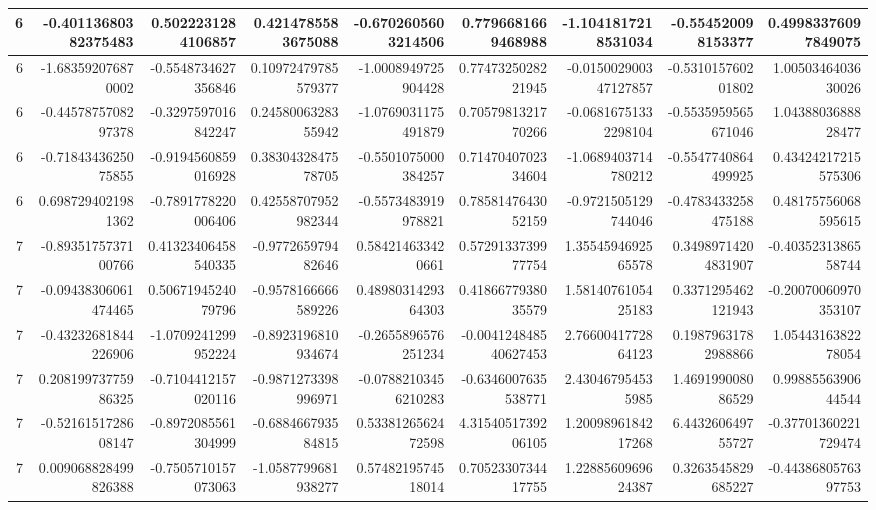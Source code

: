 \documentclass{jlreq}
\numberwithin{equation}{section}
\begin{document}
\begin{table}[H]
{\begin{tabular}{|r|r|r|r|r|r|r|r|r|}
      6 & -0.40113680382375483  & 0.5022231284106857    & 0.4214785583675088   & -0.6702605603214506  & 0.7796681669468988    & -1.1041817218531034   & -0.554520098153377    & 0.49983376097849075   \\ \hline
      6 & -1.683592076870002    & -0.5548734627356846   & 0.10972479785579377  & -1.0008949725904428  & 0.7747325028221945    & -0.015002900347127857 & -0.531015760201802    & 1.0050346403630026    \\ \hline
      6 & -0.4457875708297378   & -0.3297597016842247   & 0.2458006328355942   & -1.0769031175491879  & 0.7057981321770266    & -0.06816751332298104  & -0.5535959565671046   & 1.0438803688828477    \\ \hline
      6 & -0.7184343625075855   & -0.9194560859016928   & 0.3830432847578705   & -0.5501075000384257  & 0.7147040702334604    & -1.0689403714780212   & -0.5547740864499925   & 0.43424217215575306   \\ \hline
      6 & 0.6987294021981362    & -0.7891778220006406   & 0.42558707952982344  & -0.5573483919978821  & 0.7858147643052159    & -0.9721505129744046   & -0.4783433258475188   & 0.48175756068595615   \\ \hline
      7 & -0.8935175737100766   & 0.41323406458540335   & -0.977265979482646   & 0.584214633420661    & 0.5729133739977754    & 1.3554594692565578    & 0.34989714204831907   & -0.4035231386558744   \\ \hline
      7 & -0.09438306061474465  & 0.5067194524079796    & -0.9578166666589226  & 0.4898031429364303   & 0.4186677938035579    & 1.5814076105425183    & 0.3371295462121943    & -0.20070060970353107  \\ \hline
      7 & -0.43232681844226906  & -1.0709241299952224   & -0.8923196810934674  & -0.2655896576251234  & -0.004124848540627453 & 2.7660041772864123    & 0.19879631782988866   & 1.0544316382278054    \\ \hline
      7 & 0.20819973775986325   & -0.7104412157020116   & -0.9871273398996971  & -0.07882103456210283 & -0.6346007635538771   & 2.430467954535985     & 1.469199008086529     & 0.9988556390644544    \\ \hline
      7 & -0.5216151728608147   & -0.8972085561304999   & -0.688466793584815   & 0.5338126562472598   & 4.3154051739206105    & 1.2009896184217268    & 6.443260649755727     & -0.37701360221729474  \\ \hline
      7 & 0.009068828499826388  & -0.7505710157073063   & -1.0587799681938277  & 0.5748219574518014   & 0.7052330734417755    & 1.2288560969624387    & 0.3263545829685227    & -0.4438680576397753   \\ \hline

\end{tabular}}
\end{table}
\end{document}
